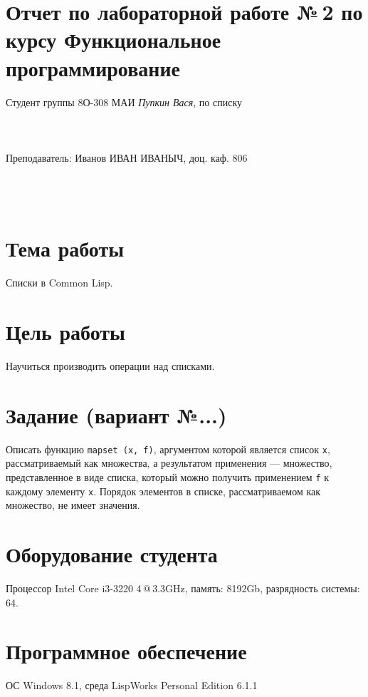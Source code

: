 \documentclass[12pt]{article}
\begin{document}
\section*{Отчет по лабораторной работе №\,2 
по курсу \guillemotleft Функциональное программирование\guillemotright}
\begin{flushright}
Студент группы 8О-308 МАИ \textit{Пупкин Вася},  по списку \\
 \\
 \\
\ \\
Преподаватель: Иванов ИВАН ИВАНЫЧ, доц. каф. 806 \\
 \\
 \\
 \\

\end{flushright}

\section{Тема работы}
Списки в Common Lisp.

\section{Цель работы}
Научиться производить операции над списками.

\section{Задание (вариант №...)}
Описать функцию {\tt mapset (x, f)}, аргументом которой является список {\tt x}, рассматриваемый как множества, а результатом применения --- множество, представленное в виде списка, который можно получить применением {\tt f} к каждому элементу {\tt x}. Порядок элементов в списке, рассматриваемом как множество, не имеет значения.

\section{Оборудование студента}
Процессор Intel Core i3-3220 4\,@\,3.3GHz, память: 8192Gb, разрядность системы: 64.

\section{Программное обеспечение}
ОС Windows 8.1, среда LispWorks Personal Edition 6.1.1
\end{document}

